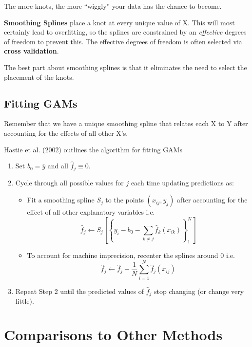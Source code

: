 \documentclass[12pt]{../notes}
\begin{document}
\nspace
The more knots, the more ``wiggly'' your data has the chance to become. 

\nspace
\textbf{Smoothing Splines} place a knot at every unique value of X. This will most certainly lead to overfitting, so the splines are constrained by an \textit{effective} degrees of freedom to prevent this. The effective degrees of freedom is often selected via \textbf{cross validation}. 

\nspace 
The best part about smoothing splines is that it eliminates the need to select the placement of the knots. 

\subsection{Fitting GAMs}
Remember that we have a unique smoothing spline that relates each X to Y after accounting for the effects of all other X's. 

Hastie et al. (2002) outlines the algorithm for fitting GAMs

\begin{enumerate}
\item Set $b_0 = \bar{y}$ and all $\hat{f}_j \equiv 0$.
\item Cycle through all possible values for $j$ each time updating predictions as:
\begin{itemize}
\item Fit a smoothing spline $S_j$ to the points $(x_{ij}, y_j)$ after accounting for the effect of all other explanatory variables i.e. 
\begin{equation*}
\hat{f}_j \leftarrow S_j\left[\left\{y_i - b_0 - \sum_{k \ne j}\hat{f}_k(x_{ik})\right\}^N_1\right]
\end{equation*}
\item To account for machine imprecision, recenter the splines around 0 i.e.
\begin{equation*}
\hat{f}_j \leftarrow \hat{f}_j  - \frac{1}{N}\sum_{i=1}^N \hat{f}_j(x_{ij})
\end{equation*}
\end{itemize} 
\item Repeat Step 2 until the predicted values of $\hat{f}_j$ stop changing (or change very little). 
\end{enumerate}

\section{Comparisons to Other Methods}
\end{document}
